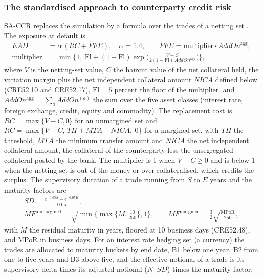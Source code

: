 \subsubsection{The standardised approach to counterparty credit risk}

SA-CCR replaces the simulation by a formula over the trades of a netting set \citep{ccr:cre52}. The exposure at default is
\begin{equation}
\begin{aligned}
EAD&=\alpha\,(RC+PFE),\quad \alpha=1.4,\qquad PFE=\text{multiplier}\cdot AddOn^{\mathrm{agg}},\\
\text{multiplier}&=\min\Big\{1,\ \mathrm{Fl}+(1-\mathrm{Fl})\exp\Big(\frac{V-C}{2(1-\mathrm{Fl})\,AddOn^{\mathrm{agg}}}\Big)\Big\},
\end{aligned}
\label{eq:ccr-sa}
\end{equation}
where $V$ is the netting-set value, $C$ the haircut value of the net collateral held, the variation margin plus the net independent collateral amount $NICA$ defined below (CRE52.10 and CRE52.17), $\mathrm{Fl}=5$ percent the floor of the multiplier, and $AddOn^{\mathrm{agg}}=\sum_aAddOn^{(a)}$ the sum over the five asset classes (interest rate, foreign exchange, credit, equity and commodity). The replacement cost is $RC=\max\{V-C,0\}$ for an
unmargined set and $RC=\max\{V-C,\ TH+MTA-NICA,\ 0\}$ for a margined set, with $TH$ the threshold, $MTA$ the minimum transfer amount and $NICA$ the net independent collateral amount, the collateral of the counterparty less the unsegregated collateral posted by the bank. The multiplier is 1 when $V-C\ge0$ and is below 1 when the netting set is out of the money
or over-collateralised, which credits the surplus. The supervisory duration of a trade running from $S$ to $E$ years and the maturity factors are
\begin{equation}
\begin{gathered}
SD=\frac{e^{-0.05S}-e^{-0.05E}}{0.05},\\
MF^{\mathrm{unmargined}}=\sqrt{\min\{\max\{M,\tfrac{10}{250}\},1\}},\qquad MF^{\mathrm{margined}}=\frac{3}{2}\sqrt{\frac{\mathrm{MPoR}}{250}},
\end{gathered}
\label{eq:ccr-sd}
\end{equation}
with $M$ the residual maturity in years, floored at 10 business days (CRE52.48), and MPoR in business days. For an interest rate hedging set (a currency) the trades are allocated to maturity buckets by end date, B1 below one year, B2 from one to five years and B3 above five, and the effective notional of a trade is its supervisory delta times its adjusted notional ($N\cdot SD$) times the maturity factor;
